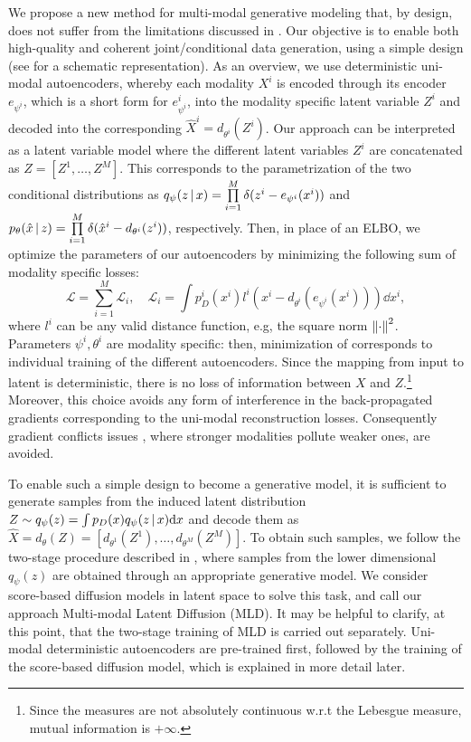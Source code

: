 We propose a new method for multi-modal generative modeling that, by design, does not suffer from the limitations discussed in . Our objective is to enable both high-quality and coherent joint/conditional data generation, using a simple design (see  for a schematic representation).
As an overview, we use deterministic uni-modal autoencoders, whereby each modality $X^i$ is encoded through its encoder $e_{\psi^i}$, which is a short form for $e^i_{\psi^i}$, into the modality specific latent variable $Z^i$ and decoded into the corresponding $\hat{X}^i=d_{\theta^i}(Z^i)$. Our approach can be interpreted as a latent variable model where the different latent variables $Z^i$ are concatenated as $Z=[Z^1,\dots,Z^M]$. This corresponds to the parametrization of the two conditional distributions as $q_\psi(z\,|\, x)=\prod\limits_{i=1}^{M} \delta(z^i-e_{\psi^i}(x^i))$ and $p_\theta(\hat{x}\,|\, z)=\prod\limits_{i=1}^{M}\delta(\hat{x}^i-d_{\theta^i}(z^i))$,  respectively.
Then, in place of an \gls{ELBO}, we optimize the parameters of our autoencoders by minimizing the following sum of modality specific losses: 
\begin{equation}\label{eq:AE}
    \mathcal{L}=\sum\limits_{i=1}^{M}\mathcal{L}_i,\quad \mathcal{L}_i=\int p_D^i(x^i)  l^i(x^i-d_{\theta^i}(e_{\psi^i}(x^i)))\dd x^i,
\end{equation}
where $l^i$ can be any valid distance function, e.g, the square norm $\norm{\cdot}^2$.
Parameters $\psi^i,\theta^i$ are modality specific: then, minimization of  corresponds to individual training of the different autoencoders.
Since the mapping from input to latent is deterministic, there is no loss of information between $X$ and $Z$.\footnote{Since the measures are not absolutely continuous w.r.t the Lebesgue measure, mutual information is $+\infty$.} Moreover, this choice avoids any form of interference in the back-propagated gradients corresponding to the uni-modal reconstruction losses. Consequently gradient conflicts issues \citep{Javaloy2022}, where stronger modalities pollute weaker ones, are avoided. 


To enable such a simple design to become a generative model, it is sufficient to generate samples from the induced latent distribution $Z\sim q_\psi(z)= \int p_D(x) q_\psi(z\,|\, x)\dd x$ and decode them as $\hat{X}=d_\theta(Z)=[d_{\theta^1}(Z^1),\dots,d_{\theta^M}(Z^M)]$. To obtain such samples, we follow the two-stage procedure described in \cite{loaizadiagnosing,tran2021model}, where samples from the lower dimensional $q_\psi(z)$ are obtained through an appropriate generative model. We consider score-based diffusion models in latent space \citep{Rombach_2022_CVPR,Vahdat2021} to solve this task, and call our approach Multi-modal Latent Diffusion (\gls{MLD}). %
It may be helpful to clarify, at this point, that the two-stage training of \gls{MLD} is carried out separately. Uni-modal deterministic autoencoders are pre-trained first, followed by the training of the score-based diffusion model, which is explained in more detail later.

